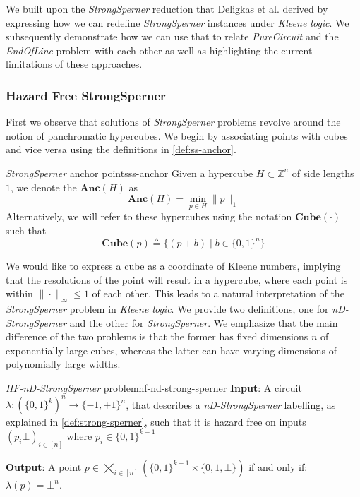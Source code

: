 We built upon the \textit{StrongSperner} reduction that Deligkas et al. \cite{deligkas_PureCircuitTightInapproximability_2024}
derived by expressing how we can redefine \textit{StrongSperner} instances under \textit{Kleene logic}.
We subsequently demonstrate how we can use that to relate \textit{PureCircuit} and
the \textit{EndOfLine} problem with each other as well as highlighting
the current limitations of these approaches.

\subsubsection{Hazard Free StrongSperner}

First we observe that solutions of \textit{StrongSperner} problems
revolve around the notion of panchromatic hypercubes. We begin by
associating points with cubes and vice versa using the definitions
in \ref{def:ss-anchor}.

\begin{definitionbox}{\textit{StrongSperner} anchor points}{ss-anchor}
    Given a hypercube $H \subset \mathbb{Z}^n$ of side lengths $1$, we denote
    the $\textbf{Anc}(H)$ as
    $$
        \textbf{Anc}(H) = \min_{p \in H} \|p\|_{1}
    $$
    Alternatively, we will refer to these hypercubes using the notation $\textbf{Cube}(\cdot)$ such that
    $$
        \textbf{Cube}(p) \triangleq \big\{(p + b) \mid b \in \{0,1\}^n \big\}
    $$
\end{definitionbox}

We would like to express a cube as a coordinate of Kleene numbers, implying
that the resolutions of the point will result in a hypercube, where each point is within
$\|\cdot\|_{\infty} \leq 1$ of each other.
This leads to a natural interpretation of the \textit{StrongSperner} problem in \textit{Kleene logic}.
We provide two definitions, one for \textit{nD-StrongSperner} and the other for
\textit{StrongSperner}. We emphasize that the main difference of the two problems is that the former
has fixed dimensions $n$ of exponentially large cubes, whereas the latter can have varying
dimensions of polynomially large widths.


\begin{definitionbox}{\textit{HF-nD-StrongSperner} problem}{hf-nd-strong-sperner}
    \textbf{Input}: A circuit $\lambda: (\{0,1\}^k)^n \to \{-1, +1\}^n$, that describes a \textit{nD-StrongSperner} labelling,
    as explained in \ref{def:strong-sperner}, such that it is hazard free on inputs
    $(p_i\bot)_{i \in[n]}$ where $p_i \in \{0,1\}^{k-1}$

    \textbf{Output}: A point $p \in \bigtimes_{i \in [n]} \left(\{0,1\}^{k-1} \times \{0,1 ,\bot\}\right)$ if and only if: $\lambda(p) =  \bot^n$.
\end{definitionbox}

